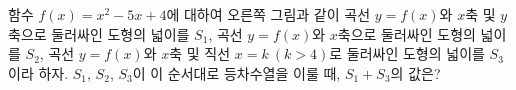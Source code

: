 \noindent\begin{minipage}[t]{0.58\linewidth}\vspace{0pt}\raggedright 함수 $f(x)=x^2-5x+4$에 대하여 오른쪽 그림과 같이 곡선 $y=f(x)$와 $x$축 및 $y$축으로 둘러싸인 도형의 넓이를 $S_1$, 곡선 $y=f(x)$와 $x$축으로 둘러싸인 도형의 넓이를 $S_2$, 곡선 $y=f(x)$와 $x$축 및 직선 $x=k\ (k>4)$로 둘러싸인 도형의 넓이를 $S_3$이라 하자. $S_1$, $S_2$, $S_3$이 이 순서대로 등차수열을 이룰 때, $S_1+S_3$의 값은?\end{minipage}\hfill\begin{minipage}[t]{0.4\linewidth}\vspace{0pt}\centering \resizebox{\ifdim\width>\linewidth\linewidth\else\width\fi}{!}{}\end{minipage}\par
{}
